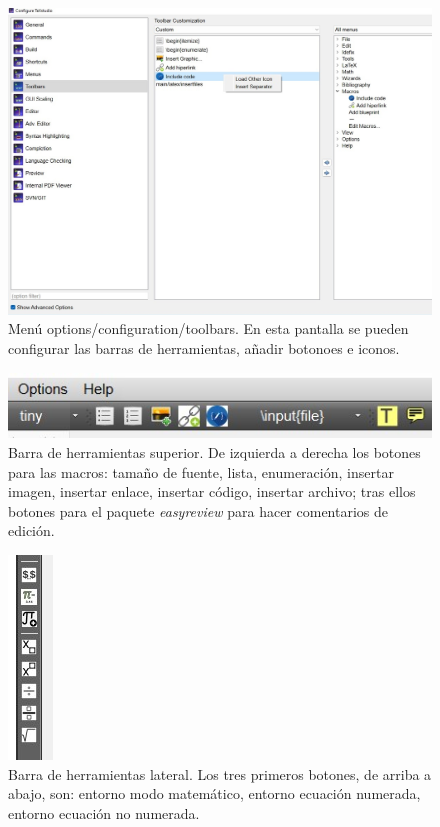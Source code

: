 \begin{figure}[h]
	\centering
	\includegraphics[width=1\linewidth, frame]{anexos/macros/imagenes/macros-boton-icono}
	\caption[Menú options/configuration/toolbars.]{Menú options/configuration/toolbars. En esta pantalla se pueden configurar las barras de herramientas, añadir botonoes e iconos.}
	\label{fig:macros-boton-icono}
\end{figure}

\begin{figure}[h]
	\centering
	\includegraphics[scale=1, frame]{anexos/macros/imagenes/toolbar-sup}
	\caption[Barra de herramientas superior.]{Barra de herramientas superior. De izquierda a derecha los botones para las macros: tamaño de fuente, lista, enumeración, insertar imagen, insertar enlace, insertar código, insertar archivo; tras ellos botones para el paquete \textit{easyreview} para hacer comentarios de edición.}
	\label{fig:toolbar-sup}
\end{figure}

\begin{figure}[h]
	\centering
	\includegraphics[scale=1, frame]{anexos/macros/imagenes/toolbar-lat}
	\caption[Barra de herramientas lateral.]{Barra de herramientas lateral. Los tres primeros botones, de arriba a abajo, son: entorno modo matemático, entorno ecuación numerada, entorno ecuación no numerada.}
	\label{fig:toolbar-lat}
\end{figure}
